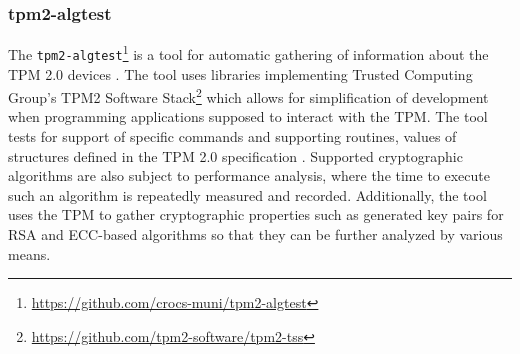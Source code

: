 \subsubsection{tpm2-algtest}
 The \texttt{tpm2-algtest}\footnote{\url{https://github.com/crocs-muni/tpm2-algtest}} is a tool for automatic gathering of information about the TPM 2.0 devices \cite{Struk2019thesis}. The tool uses libraries implementing Trusted Computing Group's TPM2 Software Stack\footnote{\url{https://github.com/tpm2-software/tpm2-tss}} which allows for simplification of development when programming applications supposed to interact with the TPM. The tool tests for support of specific commands and supporting routines, values of structures defined in the TPM 2.0 specification \cite{tcg_p3_commands, tcg_p4_supproutines, tcg_p2_structures}. Supported cryptographic algorithms are also subject to performance analysis, where the time to execute such an algorithm is repeatedly measured and recorded. Additionally, the tool uses the TPM to gather cryptographic properties such as generated key pairs for RSA and ECC-based algorithms so that they can be further analyzed by various means.
